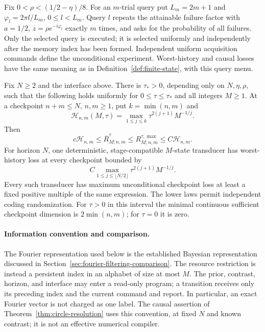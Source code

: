 Fix $0<\rho<(1/2-\eta)/8$. For an $m$-trial query put
$L_m=2m+1$ and $\varphi_l=2\pi l/L_m$, $0\le l<L_m$.
Query $l$ repeats the attainable failure factor with
$a=1/2$, $z=\rho e^{-i\varphi_l}$ exactly $m$ times, and asks for
the probability of all failures. Only the selected query is executed;
it is selected uniformly and independently after the memory index has
been formed. Independent uniform acquisition commands define the
unconditional experiment. Worst-history and causal losses have the same
meaning as in Definition~\ref{def:finite-state}, with this query menu.

\begin{theorem}
\label{thm:circle-resolution}
Fix $N\ge2$ and the interface above. There is $\tau_*>0$, depending
only on $N,\eta,\rho$, such that the following holds uniformly for
$0\le\tau\le\tau_*$ and all integers $M\ge1$. At a checkpoint
$n+m\le N$, $n,m\ge1$, put $k=\min(n,m)$ and
\begin{equation}\label{eq:circle-profile}
 \mathcal H_{n,m}(M,\tau)
 =\max_{1\le j\le k}\tau^{2(j+1)}M^{-1/j}.
\end{equation}
Then
\begin{equation}\label{eq:circle-checkpoint-law}
 c\mathcal H_{n,m}\le\overline R^{\tau}_{M;n,m}
 \le R^{\tau,\max}_{M;n,m}\le C\mathcal H_{n,m}.
\end{equation}
For horizon $N$, one deterministic, stage-compatible $M$-state transducer
has worst-history loss at every checkpoint bounded by
\begin{equation}\label{eq:circle-causal-profile}
 C\max_{1\le j\le\lfloor N/2\rfloor}
          \tau^{2(j+1)}M^{-1/j}.
\end{equation}
Every such transducer has maximum unconditional checkpoint loss at least
a fixed positive multiple of the same expression. The lower laws permit
independent coding randomization. For $\tau>0$ in this interval the
minimal continuous sufficient checkpoint dimension is $2\min(n,m)$;
for $\tau=0$ it is zero.
\end{theorem}

\paragraph{Information convention and comparison.}
The Fourier representation used below is the established Bayesian
representation discussed in Section~\ref{sec:fourier-filtering-comparison}.
The resource restriction is instead a persistent index in an alphabet
of size at most $M$. The prior, contrast, horizon, and interface may
enter a read-only program; a transition receives only its preceding
index and the current command and report. In particular, an exact
Fourier vector is not charged as one label. The causal assertion of
Theorem~\ref{thm:circle-resolution} uses this convention, at fixed
$N$ and known contrast; it is not an effective numerical compiler.

